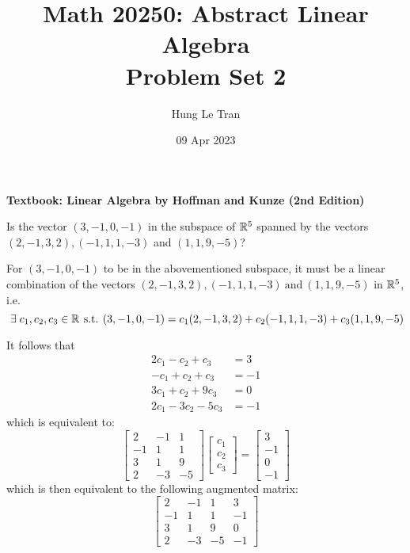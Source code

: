 \documentclass[a4paper, 11pt]{article}
\title{Math 20250: Abstract Linear Algebra \\ \large Problem Set 2}
\date{09 Apr 2023}
\author{Hung Le Tran}
\begin{document}
\maketitle
\newpage
\setcounter{section}{2}
\textbf{Textbook: Linear Algebra by Hoffman and Kunze (2nd Edition)}
\begin{problem} 
Is the vector \((3, -1, 0, -1)\) in the subspace of \(\mathbb{R}^5\) spanned by the vectors \((2, -1, 3, 2), (-1, 1, 1, -3)\) and \((1, 1, 9, -5)\)?
\end{problem}
\begin{solution}
    For \((3, -1, 0, -1)\) to be in the abovementioned subspace, it must be a linear combination of the vectors \((2, -1, 3, 2), (-1, 1, 1, -3) \:\text{and}\: (1, 1, 9, -5)\) in \(\mathbb{R}^5\), i.e. \[
        \exists c_1, c_2, c_3 \in \bbr \st (3, -1, 0, -1) = c_1(2, -1, 3, 2) + c_2(-1, 1, 1, -3) + c_3(1, 1, 9, -5)
    \]

    It follows that
    \begin{align*}
        2c_1 -c_2 + c_3   & =3   \\
        -c_1 + c_2 + c_3  & = -1 \\
        3c_1 + c_2 + 9c_3 & = 0  \\
        2c_1 -3c_2 -5c_3  & = -1
    \end{align*}
    which is equivalent to:
    \[
        \left[\begin{array}{ccc}
                2  & -1 & 1  \\
                -1 & 1  & 1  \\
                3  & 1  & 9  \\
                2  & -3 & -5
            \end{array}\right]\left[\begin{array}{c}
                c_1 \\
                c_2 \\
                c_3
            \end{array}\right] = \left[\begin{array}{c}
                3  \\
                -1 \\
                0  \\
                -1
            \end{array}\right]
    \]
    which is then equivalent to the following augmented matrix:
    \[
        \left[\begin{array}{ccc|c}
                2  & -1 & 1  & 3  \\
                -1 & 1  & 1  & -1 \\
                3  & 1  & 9  & 0  \\
                2  & -3 & -5 & -1
            \end{array}\right]
    \]


\end{solution}
\end{document}
